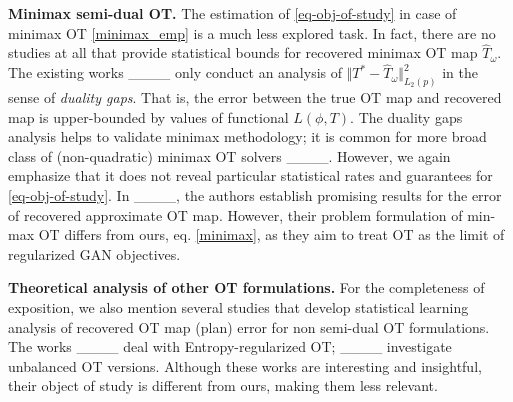 \textbf{Minimax semi-dual OT.} The estimation of \eqref{eq-obj-of-study} in case of minimax OT \eqref{minimax_emp} is a much less explored task. In fact, there are no studies at all that provide statistical bounds for recovered minimax OT map $\widehat{T}_\omega$. The existing works ____ only conduct an analysis of $\Vert T^* - \widehat{T}_{\omega} \Vert^2_{L_2(p)}$ in the sense of \textit{duality gaps}. That is, the error between the true OT map and recovered map is upper-bounded by values of functional $L(\phi, T)$. The duality gaps analysis helps to validate minimax methodology; it is common for more broad class of (non-quadratic) minimax OT solvers ____. However, we again emphasize that it does not reveal particular statistical rates and guarantees for \eqref{eq-obj-of-study}. In ____, the authors establish promising results for the error of recovered approximate OT map. However, their problem formulation of min-max OT differs from ours, eq. \eqref{minimax}, as they aim to treat OT as the limit of regularized GAN objectives. 

\textbf{Theoretical analysis of other OT formulations.} For the completeness of exposition, we also mention several studies that develop statistical learning analysis of recovered OT map (plan) error for non semi-dual OT formulations. The works ____ deal with Entropy-regularized OT; ____ investigate unbalanced OT versions.
Although these works are interesting and insightful, their object of study is different from ours, making them less relevant.


